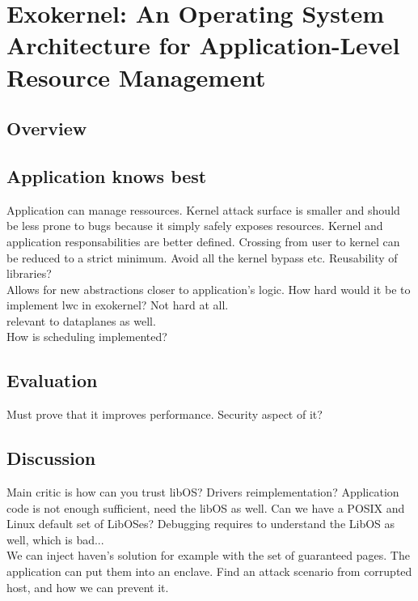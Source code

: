 \section{Exokernel: An Operating System Architecture for Application-Level Resource Management}

\subsection{Overview}

\subsection{Application knows best}
Application can manage ressources.
Kernel attack surface is smaller and should be less prone to bugs because it simply safely exposes resources.
Kernel and application responsabilities are better defined.
Crossing from user to kernel can be reduced to a strict minimum.
Avoid all the kernel bypass etc.
Reusability of libraries?\\

Allows for new abstractions closer to application's logic.
How hard would it be to implement lwc in exokernel? Not hard at all.\\

relevant to dataplanes as well.\\

How is scheduling implemented?

\subsection{Evaluation}

Must prove that it improves performance.
Security aspect of it?

\subsection{Discussion}
Main critic is how can you trust libOS?
Drivers reimplementation?
Application code is not enough sufficient, need the libOS as well.
Can we have a POSIX and Linux default set of LibOSes?
Debugging requires to understand the LibOS as well, which is bad...
\\

We can inject haven's solution for example with the set of guaranteed pages.
The application can put them into an enclave.
Find an attack scenario from corrupted host, and how we can prevent it.\\
